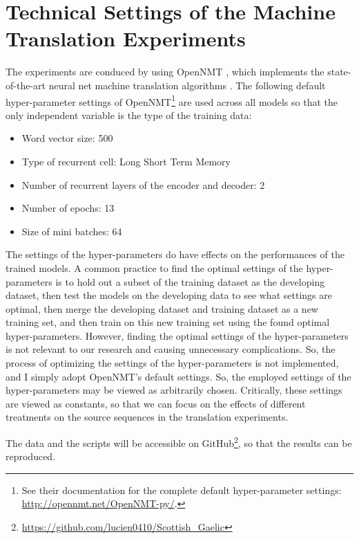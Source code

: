 \documentclass[a4paper]{article}
\begin{document}
\section{Technical Settings of the Machine Translation Experiments}\label{sec:experimet_setting}
The experiments are conduced by using OpenNMT \citep{2017opennmt}, which implements the state-of-the-art neural net machine translation algorithms \citep{cho2014properties, cho2014learning, bahdanau2014neural}. 
The following default hyper-parameter settings of OpenNMT\footnote{See their documentation for the complete default hyper-parameter settings: \url{http://opennmt.net/OpenNMT-py/}.} are used across all models so that the only independent variable is the type of the training data: 
\begin{itemize}
\item Word vector size: 500
\item Type of recurrent cell: Long Short Term Memory
\item Number of recurrent layers of the encoder and decoder: 2
\item Number of epochs: 13 
\item Size of mini batches: 64 
\end{itemize}

The settings of the hyper-parameters do have effects on the performances of the trained models. A common practice to find the optimal settings of the hyper-parameters is to hold out a subset of the training dataset as the developing dataset, then test the models on the developing data to see what settings are optimal, then merge the developing dataset and training dataset as a new training set, and then train on this new training set using the found optimal hyper-parameters. However, finding the optimal settings of the hyper-parameters is not relevant to our research and causing unnecessary complications. So, the process of optimizing the settings of the hyper-parameters is not implemented, and I simply adopt OpenNMT's default settings. So, the employed settings of the hyper-parameters may be viewed as arbitrarily chosen. Critically, these settings are viewed as constants, so that we can focus on the effects of different treatments on the source sequences in the translation experiments.

The data and the scripts will be accessible on GitHub\footnote{\url{https://github.com/lucien0410/Scottish_Gaelic}}, so that the results can be reproduced.   
\end{document}
